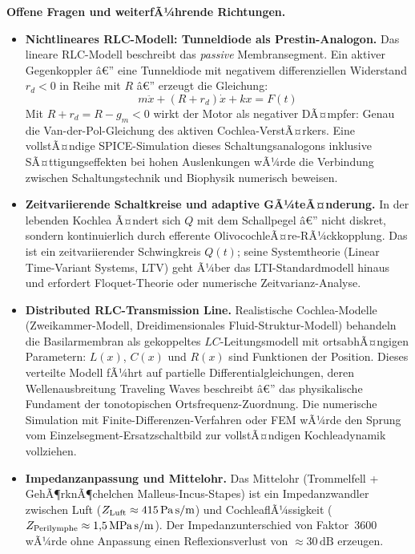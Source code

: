 ﻿\documentclass[12pt,a4paper,titlepage]{report}
\begin{document}
\textbf{Offene Fragen und weiterfÃ¼hrende Richtungen.}
\begin{itemize}[leftmargin=2em]
  \item \textbf{Nichtlineares RLC-Modell: Tunneldiode als Prestin-Analogon.}
    Das lineare RLC-Modell beschreibt das \emph{passive} Membransegment.
    Ein aktiver Gegenkoppler â€” eine Tunneldiode mit negativem
    differenziellen Widerstand $r_d < 0$ in Reihe mit $R$ â€” erzeugt
    die Gleichung:
    \[
      m\ddot{x} + (R + r_d)\dot{x} + kx = F(t)
    \]
    Mit $R + r_d = R - g_m < 0$ wirkt der Motor als negativer DÃ¤mpfer:
    Genau die Van-der-Pol-Gleichung des aktiven Cochlea-VerstÃ¤rkers.
    Eine vollstÃ¤ndige SPICE-Simulation dieses Schaltungsanalogons inklusive
    SÃ¤ttigungseffekten bei hohen Auslenkungen wÃ¼rde die Verbindung zwischen
    Schaltungstechnik und Biophysik numerisch beweisen.
  \item \textbf{Zeitvariierende Schaltkreise und adaptive GÃ¼teÃ¤nderung.}
    In der lebenden Kochlea Ã¤ndert sich $Q$ mit dem Schallpegel â€”
    nicht diskret, sondern kontinuierlich durch efferente
    OlivocochleÃ¤re-RÃ¼ckkopplung.
    Das ist ein zeitvariierender Schwingkreis $Q(t)$;
    seine Systemtheorie (Linear Time-Variant Systems, LTV)
    geht Ã¼ber das LTI-Standardmodell hinaus und erfordert
    Floquet-Theorie oder numerische Zeitvarianz-Analyse.
  \item \textbf{Distributed RLC-Transmission Line.}
    Realistische Cochlea-Modelle (Zweikammer-Modell, Dreidimensionales
    Fluid-Struktur-Modell) behandeln die Basilarmembran als
    gekoppeltes $LC$-Leitungsmodell mit ortsabhÃ¤ngigen Parametern:
    $L(x)$, $C(x)$ und $R(x)$ sind Funktionen der Position.
    Dieses verteilte Modell fÃ¼hrt auf partielle Differentialgleichungen,
    deren Wellenausbreitung Traveling Waves beschreibt â€”
    das physikalische Fundament der tonotopischen Ortsfrequenz-Zuordnung.
    Die numerische Simulation mit Finite-Differenzen-Verfahren
    oder FEM wÃ¼rde den Sprung vom Einzelsegment-Ersatzschaltbild
    zur vollstÃ¤ndigen Kochleadynamik vollziehen.
  \item \textbf{Impedanzanpassung und Mittelohr.}
    Das Mittelohr (Trommelfell + GehÃ¶rknÃ¶chelchen Malleus-Incus-Stapes)
    ist ein Impedanzwandler zwischen Luft
    ($Z_{\rm Luft} \approx 415\,\mathrm{Pa\,s/m}$) und
    CochleaflÃ¼ssigkeit ($Z_{\rm Perilymphe} \approx 1{,}5\,\mathrm{MPa\,s/m}$).
    Der Impedanzunterschied von Faktor~3600 wÃ¼rde ohne Anpassung
    einen Reflexionsverlust von $\approx 30\,\mathrm{dB}$ erzeugen.

\end{itemize}
\end{document}
